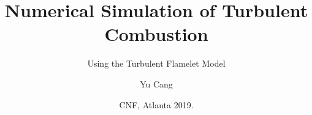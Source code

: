 \title{Numerical Simulation of Turbulent Combustion}
\subtitle{Using the Turbulent Flamelet Model}
\author{Yu Cang}

\date{\footnotesize\color{mainthemecolour} CNF, Atlanta 2019. }

